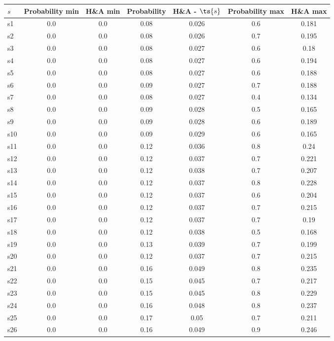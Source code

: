\documentclass{article}
\begin{document}
\noindent\begin{tabular}{|l|c|c|c|c|c|c|}
\hline
$s$& Probability min & H\&A min & Probability & H\&A - $\ts{s}$ & Probability max & H\&A max\\
\hline
s1 &0.0 & 0.0 & 0.08 & 0.026 & 0.6 & 0.181\\
\hline
s2 &0.0 & 0.0 & 0.08 & 0.026 & 0.7 & 0.195\\
\hline
s3 &0.0 & 0.0 & 0.08 & 0.027 & 0.6 & 0.18\\
\hline
s4 &0.0 & 0.0 & 0.08 & 0.027 & 0.6 & 0.194\\
\hline
s5 &0.0 & 0.0 & 0.08 & 0.027 & 0.6 & 0.188\\
\hline
s6 &0.0 & 0.0 & 0.09 & 0.027 & 0.7 & 0.188\\
\hline
s7 &0.0 & 0.0 & 0.08 & 0.027 & 0.4 & 0.134\\
\hline
s8 &0.0 & 0.0 & 0.09 & 0.028 & 0.5 & 0.165\\
\hline
s9 &0.0 & 0.0 & 0.09 & 0.028 & 0.6 & 0.189\\
\hline
s10 &0.0 & 0.0 & 0.09 & 0.029 & 0.6 & 0.165\\
\hline
s11 &0.0 & 0.0 & 0.12 & 0.036 & 0.8 & 0.24\\
\hline
s12 &0.0 & 0.0 & 0.12 & 0.037 & 0.7 & 0.221\\
\hline
s13 &0.0 & 0.0 & 0.12 & 0.038 & 0.7 & 0.207\\
\hline
s14 &0.0 & 0.0 & 0.12 & 0.037 & 0.8 & 0.228\\
\hline
s15 &0.0 & 0.0 & 0.12 & 0.037 & 0.6 & 0.204\\
\hline
s16 &0.0 & 0.0 & 0.12 & 0.037 & 0.7 & 0.215\\
\hline
s17 &0.0 & 0.0 & 0.12 & 0.037 & 0.7 & 0.19\\
\hline
s18 &0.0 & 0.0 & 0.12 & 0.038 & 0.5 & 0.168\\
\hline
s19 &0.0 & 0.0 & 0.13 & 0.039 & 0.7 & 0.199\\
\hline
s20 &0.0 & 0.0 & 0.12 & 0.037 & 0.7 & 0.215\\
\hline
s21 &0.0 & 0.0 & 0.16 & 0.049 & 0.8 & 0.235\\
\hline
s22 &0.0 & 0.0 & 0.15 & 0.045 & 0.7 & 0.217\\
\hline
s23 &0.0 & 0.0 & 0.15 & 0.045 & 0.8 & 0.229\\
\hline
s24 &0.0 & 0.0 & 0.16 & 0.048 & 0.8 & 0.237\\
\hline
s25 &0.0 & 0.0 & 0.17 & 0.05 & 0.7 & 0.211\\
\hline
s26 &0.0 & 0.0 & 0.16 & 0.049 & 0.9 & 0.246\\

\end{tabular}
\end{document}
